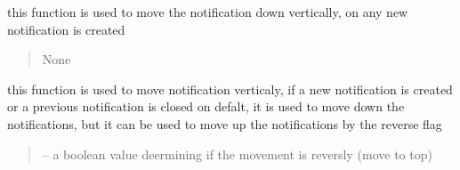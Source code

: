 \documentclass[letterpaper,10pt,english]{sphinxmanual}
\begin{document}
\begin{savenotes}
\begin{fulllineitems}
\begin{savenotes}
\begin{fulllineitems}
\begin{quote}
\begin{description}
\end{description}\end{quote}

\end{fulllineitems}\end{savenotes}


\begin{savenotes}\begin{fulllineitems}
\label{\detokenize{setting/notif_UI:oxin.notif_UI.UI_main_window.win_move_down}}
\pysigstartsignatures
{}
\pysigstopsignatures
\sphinxAtStartPar
this function is used to move the notification down vertically, on any new notification is created
\begin{quote}\begin{description}
\sphinxAtStartPar
None

\end{description}\end{quote}

\end{fulllineitems}\end{savenotes}


\begin{savenotes}\begin{fulllineitems}
\label{\detokenize{setting/notif_UI:oxin.notif_UI.UI_main_window.win_move_down_run_timer}}
\pysigstartsignatures
{}
\pysigstopsignatures
\sphinxAtStartPar
this function is used to move notification verticaly, if a new notification is created or a previous notification is closed
on defalt, it is used to move down the notifications, but it can be used to move up the notifications by the reverse flag
\begin{quote}\begin{description}
\sphinxAtStartPar
{} – a boolean value deermining if the movement is reversly (move to top)


\end{description}
\end{quote}
\end{fulllineitems}
\end{savenotes}
\end{fulllineitems}
\end{savenotes}
\end{document}
